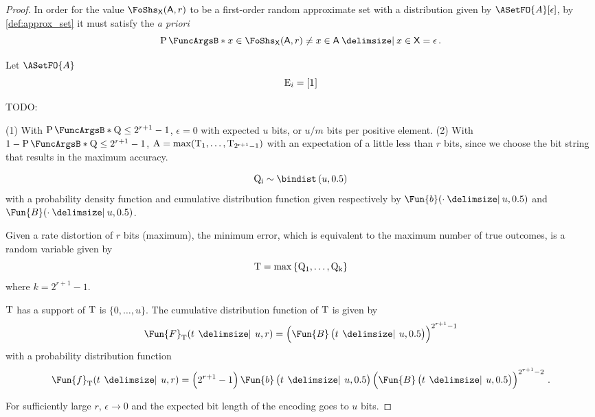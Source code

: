 \documentclass[ ../main.tex]{subfiles}
\begin{document}
\begin{proof}
In order for the value $\FoShs_{\Set{X}}(\Set{A},r)$ to be a first-order random approximate set with a distribution given by $\ASetFO{A}[\epsilon]$, by \cref{def:approx_set} it must satisfy the \emph{a priori}
\begin{equation}
	\Prob{x \in \FoShs_{\Set{X}}(\Set{A},r) \neq x \in \Set{A} \Given x \in \Set{X}} = \epsilon\,.
\end{equation}

Let $\ASetFO{A}$
\begin{equation}
	\RV{E}_i = [\SetIndicator{}]
\end{equation}



TODO:

(1) With $\Prob{\RV{Q} \leq 2^{r+1}-1}$, $\epsilon = 0$ with expected $u$ bits, or $u/m$ bits per positive element.
(2) With $1-\Prob{\RV{Q} \leq 2^{r+1}-1}$, $\mathrm{A} = \max(\mathrm{T_1},\ldots,\mathrm{T_{2^{r+1}-1}})$ with an expectation of a little less than $r$ bits, since we choose the bit string that results in the maximum accuracy.

\begin{equation}
	\RV{Q_i} \sim \bindist\left(u, 0.5\right)
\end{equation}
with a probability density function and cumulative distribution function given respectively by
$\Fun{b}(\cdot \Given u, 0.5)$ and $\Fun{B}(\cdot \Given u, 0.5)$.

Given a rate distortion of $r$ bits (maximum), the minimum error, which is equivalent to the maximum number of true outcomes, is a random variable given by
\begin{equation}
	\mathrm{T} = \max\left\{\mathrm{Q_1}, \ldots, \mathrm{Q_k}\right\}
\end{equation}
where $k = 2^{r+1}-1$.

$\mathrm{T}$ has a support of $\mathrm{T}$ is $\{0,\ldots,u\}$.
The cumulative distribution function of $\mathrm{T}$ is given by
\begin{equation}
	\Fun{F}_{\RV{T}}(t \,\Given \,u, r) = \left(\Fun{B}\left(t \,\Given \, u, 0.5\right)\right)^{2^{r+1}-1}
\end{equation}
with a probability distribution function
\begin{equation}
	\Fun{f}_{\RV{T}}(t \,\Given \,u, r) = \left(2^{r+1}-1\right) \Fun{b}
	\left(t \,\Given \, u, 0.5\right) \left(\Fun{B}
		\left(t \,\Given \, u, 0.5\right)\right)^{2^{r+1}-2}\,.
\end{equation}

For sufficiently large $r$, $\epsilon \to 0$ and the expected bit length of the encoding goes to $u$ bits.


\end{proof}
\end{document}
